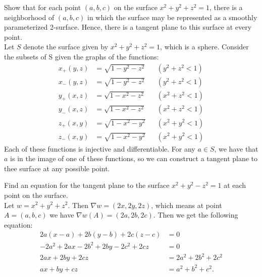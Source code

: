 \documentclass[12pt]{book}
\newenvironment{exercise}[2][Exercise]{\begin{trivlist}
\item[\hskip \labelsep {\bfseries #1}\hskip \labelsep {\bfseries #2.}]}{\end{trivlist}}
\begin{document}
\begin{exercise}{9.4.12}
    Show that for each point $(a,b,c)$ on the surface $x^2 + y^2 + z^2 =1$, there is a neighborhood of $(a,b,c)$ in which the surface may be represented as a smoothly parameterized 2-surface. Hence, there is a tangent plane to this surface at every point. \\

    Let $S$ denote the surface given by $x^2 + y^2 + z^2 =1$, which is a sphere. Consider the subsets of S given the graphs of the functions:
    \begin{align*}
        x_+ (y,z) &= \sqrt{ 1 - y^2 - z^2 } && (y^2 + z^2 < 1) \\
        x_- (y,z) &= \sqrt{ 1 - y^2 - z^2 } && (y^2 + z^2 < 1) \\
        y_+ (x,z) &= \sqrt{ 1 - x^2 - z^2 } && (x^2 + z^2 < 1) \\
        y_- (x,z) &= \sqrt{ 1 - x^2 - z^2 } && (x^2 + z^2 < 1) \\
        z_+ (x,y) &= \sqrt{ 1 - x^2 - y^2 } && (x^2 + y^2 < 1) \\
        z_- (x,y) &= \sqrt{ 1 - x^2 - y^2 } && (x^2 + y^2 < 1)
    \end{align*}
    Each of these functions is injective and differentiable. For any $a \in S$, we have that $a$ is in the image of one of these functions, so we can construct a tangent plane to thee surface at any possible point.
\end{exercise}

\begin{exercise}{9.4.13}
    Find an equation for the tangent plane to the surface $x^2 + y^2 -z^2 = 1$ at each point on the surface.  \\
    
    Let $w = x^2 + y^2 + z^2 $. Then $\nabla w = \left( 2x, 2y, 2z \right)$, which means at point $A = (a,b,c)$ we have $\nabla w(A) = \left( 2a, 2b, 2c \right)$. Then we get the following equation:
    \begin{align*}
    2 a (x -a ) + 2b (y-b) + 2c (z -c ) &= 0\\
    -2 a^2 + 2 ax - 2b^2 + 2 by - 2c^2 + 2 cz &= 0  \\
    2 ax + 2 by + 2cz &= 2 a^2 + 2 b^2 + 2c^2 \\
    ax + by + cz &= a^2 + b^2 + c^2 .
    \end{align*} 
\end{exercise}




\end{document}
